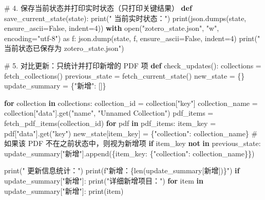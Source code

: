 \documentclass[
  letterpaper,
  DIV=11,
  numbers=noendperiod]{scrreprt}
\newenvironment{Shaded}{\begin{snugshade}}{\end{snugshade}}
\newcommand{\BuiltInTok}[1]{\textcolor[rgb]{0.00,0.23,0.31}{#1}}
\newcommand{\CommentTok}[1]{\textcolor[rgb]{0.37,0.37,0.37}{#1}}
\newcommand{\ControlFlowTok}[1]{\textcolor[rgb]{0.00,0.23,0.31}{\textbf{#1}}}
\newcommand{\DecValTok}[1]{\textcolor[rgb]{0.68,0.00,0.00}{#1}}
\newcommand{\ImportTok}[1]{\textcolor[rgb]{0.00,0.46,0.62}{#1}}
\newcommand{\KeywordTok}[1]{\textcolor[rgb]{0.00,0.23,0.31}{\textbf{#1}}}
\newcommand{\NormalTok}[1]{\textcolor[rgb]{0.00,0.23,0.31}{#1}}
\newcommand{\OperatorTok}[1]{\textcolor[rgb]{0.37,0.37,0.37}{#1}}
\newcommand{\SpecialCharTok}[1]{\textcolor[rgb]{0.37,0.37,0.37}{#1}}
\newcommand{\SpecialStringTok}[1]{\textcolor[rgb]{0.13,0.47,0.30}{#1}}
\newcommand{\StringTok}[1]{\textcolor[rgb]{0.13,0.47,0.30}{#1}}
\newcommand{\VariableTok}[1]{\textcolor[rgb]{0.07,0.07,0.07}{#1}}
\begin{document}
\begin{Shaded}
\begin{Highlighting}[]
\CommentTok{\# 4. 保存当前状态并打印实时状态（只打印关键结果）}
\KeywordTok{def}\NormalTok{ save\_current\_state(state):}
    \BuiltInTok{print}\NormalTok{(}\StringTok{" 当前实时状态："}\NormalTok{)}
    \BuiltInTok{print}\NormalTok{(json.dumps(state, ensure\_ascii}\OperatorTok{=}\VariableTok{False}\NormalTok{, indent}\OperatorTok{=}\DecValTok{4}\NormalTok{))}
    \ControlFlowTok{with} \BuiltInTok{open}\NormalTok{(}\StringTok{"zotero\_state.json"}\NormalTok{, }\StringTok{"w"}\NormalTok{, encoding}\OperatorTok{=}\StringTok{"utf{-}8"}\NormalTok{) }\ImportTok{as}\NormalTok{ f:}
\NormalTok{        json.dump(state, f, ensure\_ascii}\OperatorTok{=}\VariableTok{False}\NormalTok{, indent}\OperatorTok{=}\DecValTok{4}\NormalTok{)}
    \BuiltInTok{print}\NormalTok{(}\StringTok{" 当前状态已保存为 zotero\_state.json"}\NormalTok{)}

\CommentTok{\# 5. 对比更新：只统计并打印新增的 PDF 项}
\KeywordTok{def}\NormalTok{ check\_updates():}
\NormalTok{    collections }\OperatorTok{=}\NormalTok{ fetch\_collections()}
\NormalTok{    previous\_state }\OperatorTok{=}\NormalTok{ fetch\_current\_state()}
\NormalTok{    new\_state }\OperatorTok{=}\NormalTok{ \{\}}
\NormalTok{    update\_summary }\OperatorTok{=}\NormalTok{ \{}\StringTok{"新增"}\NormalTok{: []\}}

    \ControlFlowTok{for}\NormalTok{ collection }\KeywordTok{in}\NormalTok{ collections:}
\NormalTok{        collection\_id }\OperatorTok{=}\NormalTok{ collection[}\StringTok{"key"}\NormalTok{]}
\NormalTok{        collection\_name }\OperatorTok{=}\NormalTok{ collection[}\StringTok{"data"}\NormalTok{].get(}\StringTok{"name"}\NormalTok{, }\StringTok{"Unnamed Collection"}\NormalTok{)}
\NormalTok{        pdf\_items }\OperatorTok{=}\NormalTok{ fetch\_pdf\_items(collection\_id)}
        \ControlFlowTok{for}\NormalTok{ pdf }\KeywordTok{in}\NormalTok{ pdf\_items:}
\NormalTok{            item\_key }\OperatorTok{=}\NormalTok{ pdf[}\StringTok{"data"}\NormalTok{].get(}\StringTok{"key"}\NormalTok{)}
\NormalTok{            new\_state[item\_key] }\OperatorTok{=}\NormalTok{ \{}\StringTok{"collection"}\NormalTok{: collection\_name\}}
            \CommentTok{\# 如果该 PDF 不在之前状态中，则视为新增项}
            \ControlFlowTok{if}\NormalTok{ item\_key }\KeywordTok{not} \KeywordTok{in}\NormalTok{ previous\_state:}
\NormalTok{                update\_summary[}\StringTok{"新增"}\NormalTok{].append(\{item\_key: \{}\StringTok{"collection"}\NormalTok{: collection\_name\}\})}
                
    \BuiltInTok{print}\NormalTok{(}\StringTok{" 更新信息统计："}\NormalTok{)}
    \BuiltInTok{print}\NormalTok{(}\SpecialStringTok{f"新增：}\SpecialCharTok{\{}\BuiltInTok{len}\NormalTok{(update\_summary[}\StringTok{\textquotesingle{}新增\textquotesingle{}}\NormalTok{])}\SpecialCharTok{\}}\SpecialStringTok{"}\NormalTok{)}
    \ControlFlowTok{if}\NormalTok{ update\_summary[}\StringTok{"新增"}\NormalTok{]:}
        \BuiltInTok{print}\NormalTok{(}\StringTok{"详细新增项目："}\NormalTok{)}
        \ControlFlowTok{for}\NormalTok{ item }\KeywordTok{in}\NormalTok{ update\_summary[}\StringTok{"新增"}\NormalTok{]:}
            \BuiltInTok{print}\NormalTok{(item)}
    

\end{Highlighting}
\end{Shaded}
\end{document}
